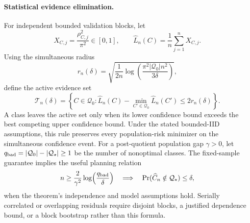 \documentclass[11pt]{article}
\begin{document}
    \paragraph{Statistical evidence elimination.}
    For independent bounded validation blocks, let
    \begin{equation}
        X_{C,j}=\frac{\rho_{C,j}^2}{\pi^2}\in[0,1],
        \qquad
        \widehat L_n(C)=\frac1n\sum_{j=1}^nX_{C,j}.
    \end{equation}
    Using the simultaneous radius
    \begin{equation}
        r_n(\delta)
        =\sqrt{\frac{1}{2n}
        \log\!\left(\frac{\pi^2|\mathcal Q_0|n^2}{3\delta}\right)},
        \label{eq:focused-anytime-radius}
    \end{equation}
    define the active evidence set
    \begin{equation}
        \mathcal T_n(\delta)
        =\left\{C\in\mathcal Q_0:
             \widehat L_n(C)-\min_{C'\in\mathcal Q_0}\widehat L_n(C')
             \le2r_n(\delta)\right\}.
        \label{eq:focused-active-set}
    \end{equation}
    A class leaves the active set only when its lower confidence bound exceeds the best
    competing upper confidence bound. Under the stated bounded-IID assumptions, this rule
    preserves every population-risk minimizer on the simultaneous confidence event.
    For a post-quotient population gap $\gamma>0$, let
    $q_{\rm bad}=|\mathcal Q_0|-|\mathcal Q_\star|\ge1$ be the number of nonoptimal
    classes. The fixed-sample guarantee implies the useful planning relation
    \begin{equation}
        n\ge\frac{2}{\gamma^2}
        \log\!\left(\frac{q_{\rm bad}}{\delta}\right)
        \quad\Longrightarrow\quad
        \Pr(\widehat C_n\notin\mathcal Q_\star)\le\delta,
        \label{eq:focused-sample-complexity}
    \end{equation}
    when the theorem's independence and model assumptions hold. Serially correlated or
    overlapping residuals require disjoint blocks, a justified dependence bound, or a block
    bootstrap rather than this formula.
\end{document}
